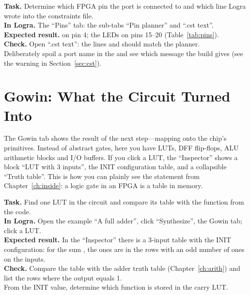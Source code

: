 
\begin{diybox}
\textbf{Task.} Determine which FPGA pin the  port is connected to and
which line Logra wrote into the constraints file.\\
\textbf{In Logra.} The ``Pins'' tab: the sub-tabs ``Pin planner'' and ``.cst text''.\\
\textbf{Expected result.}  on pin 4; the LEDs 
on pins 15--20 (Table~\ref{tab:pins}).\\
\textbf{Check.} Open ``.cst text'': the lines  and
 should match the planner.\\
 Deliberately spoil a port name in the  and see which
message the build gives (see the warning in Section~\ref{sec:cst}).
\end{diybox}

\section{Gowin: What the Circuit Turned Into}

The Gowin tab shows the result of the next step---mapping onto the
chip's primitives. Instead of abstract gates, here you have LUTs, DFF flip-flops,
ALU arithmetic blocks and I/O buffers. If you click a LUT, the ``Inspector''
shows a block ``LUT with 3 inputs'', the INIT configuration table, and a collapsible
``Truth table''. This is how you can plainly see the statement from
Chapter~\ref{ch:inside}: a logic gate in an FPGA is a table in memory.


\begin{diybox}
\textbf{Task.} Find one LUT in the circuit and compare its table with the function from
the code.\\
\textbf{In Logra.} Open the example ``A full adder'', click ``Synthesize'',
the Gowin tab; click a LUT.\\
\textbf{Expected result.} In the ``Inspector'' there is a 3-input table with the
INIT configuration: for the sum , the ones are in the rows
with an odd number of ones on the inputs.\\
\textbf{Check.} Compare the table with the adder truth table (Chapter~\ref{ch:arith}) and
list the rows where the output equals 1.\\
 From the INIT value, determine which function is stored in the carry LUT.
\end{diybox}

